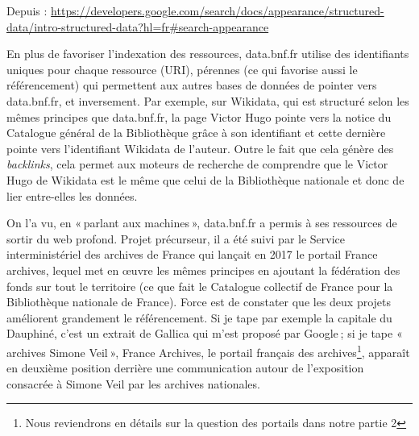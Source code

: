 \begin{center}

Depuis :  \url{https://developers.google.com/search/docs/appearance/structured-data/intro-structured-data?hl=fr#search-appearance}

\end{center}
En plus de favoriser l’indexation des ressources, data.bnf.fr utilise des identifiants uniques pour chaque ressource (URI), pérennes (ce qui favorise aussi le référencement) qui permettent aux autres bases de données de pointer vers data.bnf.fr, et inversement. Par exemple, sur Wikidata, qui est structuré selon les mêmes principes que data.bnf.fr, la page Victor Hugo pointe vers la notice du Catalogue général de la Bibliothèque grâce à son identifiant et cette dernière pointe vers l’identifiant Wikidata de l’auteur. Outre le fait que cela génère des \textit{backlinks}, cela permet aux moteurs de recherche de comprendre que le Victor Hugo de Wikidata est le même que celui de la Bibliothèque nationale et donc de lier entre-elles les données.

On l’a vu, en « parlant aux machines », data.bnf.fr a permis à ses ressources de sortir du web profond. Projet précurseur, il a été suivi par le Service interministériel des archives de France qui lançait en 2017 le portail France archives, lequel met en œuvre les mêmes principes en ajoutant la fédération des fonds sur tout le territoire (ce que fait le Catalogue collectif de France pour la Bibliothèque nationale de France). Force est de constater que les deux projets améliorent grandement le référencement. Si je tape par exemple la capitale du Dauphiné, c’est un extrait de Gallica qui m’est proposé par Google ; si je tape « archives Simone Veil », France Archives, le portail français des archives\footnote{Nous reviendrons en détails sur la question des portails dans notre partie 2}, apparaît en deuxième position derrière une communication autour de l’exposition consacrée à Simone Veil par les archives nationales.

